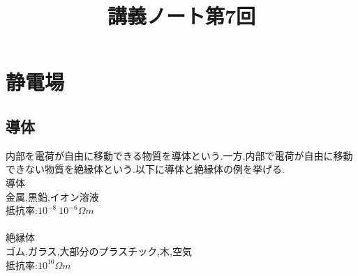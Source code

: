 \documentclass{jsarticle}
\title{講義ノート第7回}
\author{}
\date{}
\begin{document}
\maketitle

\section{静電場}

\setcounter{subsection}{12}

\subsection{導体}
内部を電荷が自由に移動できる物質を導体という.一方,内部で電荷が自由に移動できない物質を絶縁体という.以下に導体と絶縁体の例を挙げる. \\
導体 \\
金属,黒鉛,イオン溶液 \\
抵抗率:$10^{-8}~10^{-6} \Omega m$ \\
\\
絶縁体 \\
ゴム,ガラス,大部分のプラスチック,木,空気 \\
抵抗率:$10^{10} \Omega m$ \\
\end{document}
